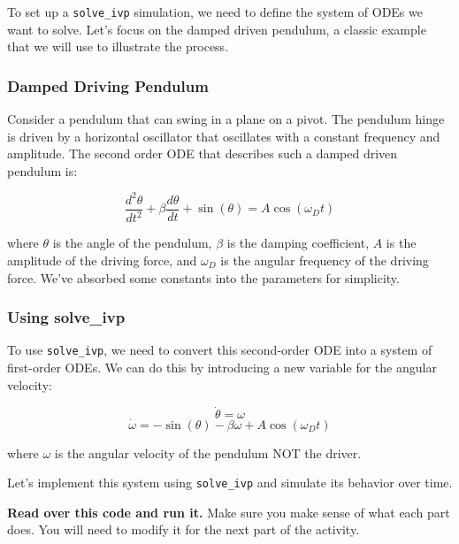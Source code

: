 \documentclass[11pt]{article}
\begin{document}
To set up a \texttt{solve\_ivp} simulation, we need to define the system
of ODEs we want to solve. Let's focus on the damped driven pendulum, a
classic example that we will use to illustrate the process.

\subsubsection{Damped Driving Pendulum}\label{damped-driving-pendulum}

Consider a pendulum that can swing in a plane on a pivot. The pendulum
hinge is driven by a horizontal oscillator that oscillates with a
constant frequency and amplitude. The second order ODE that describes
such a damped driven pendulum is:

\[
\frac{d^2\theta}{dt^2} + \beta \frac{d\theta}{dt} + \sin(\theta) = A \cos(\omega_D t)
\]

where \(\theta\) is the angle of the pendulum, \(\beta\) is the damping
coefficient, \(A\) is the amplitude of the driving force, and
\(\omega_D\) is the angular frequency of the driving force. We've
absorbed some constants into the parameters for simplicity.

\subsubsection{Using solve\_ivp}\label{using-solve_ivp}

To use \texttt{solve\_ivp}, we need to convert this second-order ODE
into a system of first-order ODEs. We can do this by introducing a new
variable for the angular velocity:

\[\dot{\theta} = \omega\]
\[\dot{\omega} = -\sin(\theta) - \beta \omega + A \cos(\omega_D t)\]

where \(\omega\) is the angular velocity of the pendulum NOT the driver.

Let's implement this system using \texttt{solve\_ivp} and simulate its
behavior over time.

\textbf{Read over this code and run it.} Make sure you make sense of
what each part does. You will need to modify it for the next part of the
activity.
\end{document}
